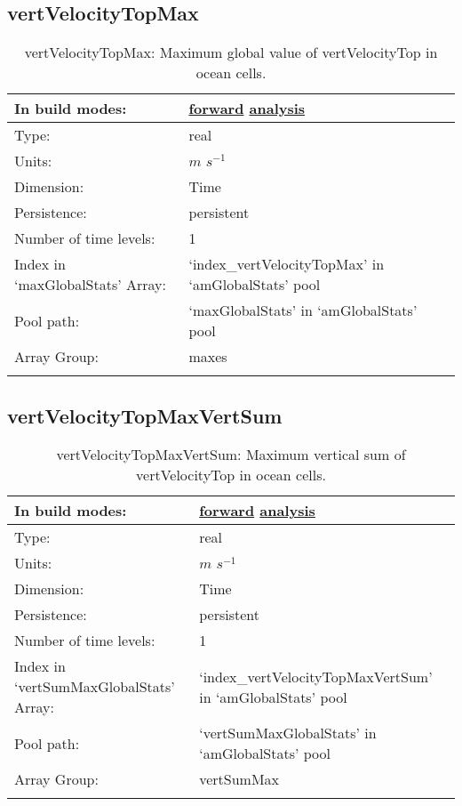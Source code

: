 \subsection[vertVelocityTopMax]{vertVelocityTopMax}
\label{subsec:var_sec_amGlobalStats_vertVelocityTopMax}
\begin{center}
\begin{longtable}{| p{2.0in} | p{4.0in} |}
        \hline 
        In build modes: & \hyperref[subsec:forward_var_tab_amGlobalStats]{forward} \hyperref[subsec:analysis_var_tab_amGlobalStats]{analysis} \\
        \hline 
        Type: & real \\
        \hline 
        Units: & $m$ $s^{-1}$ \\
        \hline 
        Dimension: & Time \\
        \hline 
        Persistence: & persistent \\
        \hline 
        Number of time levels: & 1 \\
        \hline 
		 Index in `maxGlobalStats' Array: & `index\_vertVelocityTopMax' in `amGlobalStats' pool \\
		 \hline 
            Pool path: & `maxGlobalStats' in `amGlobalStats' pool \\
		 \hline 
		 Array Group: & maxes \\
		 \hline 
    \caption{vertVelocityTopMax: Maximum global value of vertVelocityTop in ocean cells.}
\end{longtable}
\end{center}
\subsection[vertVelocityTopMaxVertSum]{vertVelocityTopMaxVertSum}
\label{subsec:var_sec_amGlobalStats_vertVelocityTopMaxVertSum}
\begin{center}
\begin{longtable}{| p{2.0in} | p{4.0in} |}
        \hline 
        In build modes: & \hyperref[subsec:forward_var_tab_amGlobalStats]{forward} \hyperref[subsec:analysis_var_tab_amGlobalStats]{analysis} \\
        \hline 
        Type: & real \\
        \hline 
        Units: & $m$ $s^{-1}$ \\
        \hline 
        Dimension: & Time \\
        \hline 
        Persistence: & persistent \\
        \hline 
        Number of time levels: & 1 \\
        \hline 
		 Index in `vertSumMaxGlobalStats' Array: & `index\_vertVelocityTopMaxVertSum' in `amGlobalStats' pool \\
		 \hline 
            Pool path: & `vertSumMaxGlobalStats' in `amGlobalStats' pool \\
		 \hline 
		 Array Group: & vertSumMax \\
		 \hline 
    \caption{vertVelocityTopMaxVertSum: Maximum vertical sum of vertVelocityTop in ocean cells.}
\end{longtable}
\end{center}
